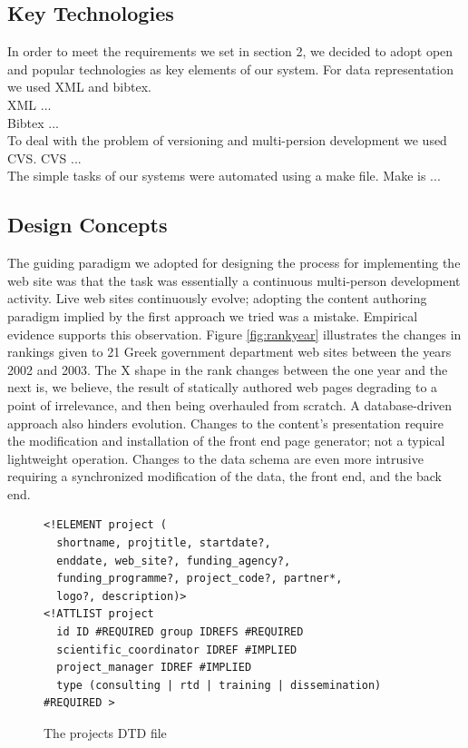 \documentclass[10pt]{article}
\begin{document}
\subsection{Key Technologies}

In order to meet the requirements we set in section 2, we decided to adopt open and popular
technologies as key elements of our system. For data representation we used XML and bibtex.\\
XML ...\\
Bibtex ...\\
To deal with the problem of versioning and multi-persion development we used CVS. CVS ...\\
The simple tasks of our systems were automated using a make file. Make is ...\\

\subsection{Design Concepts}

The guiding paradigm we adopted for designing the process
for implementing the web site was that the task was essentially
a continuous multi-person development activity.
Live web sites continuously evolve;
adopting the content authoring paradigm implied
by the first approach we tried was a mistake.
Empirical evidence supports this observation.
Figure \ref{fig:rankyear} illustrates the changes
in rankings given to 21 Greek government department
web sites between the years 2002 and 2003.
The X shape in the rank changes between the one year and the next
is, we believe, the result of statically authored web pages
degrading to a point of irrelevance, and then being overhauled
from scratch.
A database-driven approach also hinders evolution.
Changes to the content's presentation require the modification
and installation of the front end page generator;
not a typical lightweight operation.
Changes to the data schema are even more intrusive
requiring a synchronized modification of the data,
the front end, and the back end.

\begin{figure}
\lstset{language=XML,basicstyle=\ttfamily}
{\begin{lstlisting}
<!ELEMENT project (
  shortname, projtitle, startdate?, 
  enddate, web_site?, funding_agency?, 
  funding_programme?, project_code?, partner*,
  logo?, description)>
<!ATTLIST project
  id ID #REQUIRED group IDREFS #REQUIRED
  scientific_coordinator IDREF #IMPLIED
  project_manager IDREF #IMPLIED
  type (consulting | rtd | training | dissemination) #REQUIRED >
\end{lstlisting}}
\caption{The projects DTD file}
\label{fig:project-dtd}
\end{figure}
\end{document}
